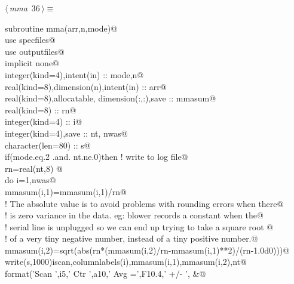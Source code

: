 \documentclass[10pt,a4paper,notitlepage]{article}
\begin{document}
\begin{flushleft} \small
\begin{minipage}{\linewidth}\label{scrap39}\raggedright\small
{} $\langle\,${\it mma}\nobreak\ {\footnotesize {36}}$\,\rangle\equiv$
\vspace{-1ex}
\begin{list}{}{} \item
\mbox{}\verb@      subroutine mma(arr,n,mode)@\\
\mbox{}\verb@      use specfiles@\\
\mbox{}\verb@      use outputfiles@\\
\mbox{}\verb@      implicit none@\\
\mbox{}\verb@      integer(kind=4),intent(in) :: mode,n@\\
\mbox{}\verb@      real(kind=8),dimension(n),intent(in) :: arr@\\
\mbox{}\verb@      real(kind=8),allocatable, dimension(:,:),save :: mmasum@\\
\mbox{}\verb@      real(kind=8) :: rn@\\
\mbox{}\verb@      integer(kind=4) :: i@\\
\mbox{}\verb@      integer(kind=4),save :: nt, nwas@\\
\mbox{}\verb@      character(len=80) :: s@\\
\mbox{}\verb@      if(mode.eq.2 .and. nt.ne.0)then ! write to log file@\\
\mbox{}\verb@        rn=real(nt,8) @\\
\mbox{}\verb@        do i=1,nwas@\\
\mbox{}\verb@        mmasum(i,1)=mmasum(i,1)/rn@\\
\mbox{}\verb@! The absolute value is to avoid problems with rounding errors when there@\\
\mbox{}\verb@! is zero variance in the data. eg: blower records a constant when the@\\
\mbox{}\verb@! serial line is unplugged so we can end up trying to take a square root @\\
\mbox{}\verb@! of a very tiny negative number, instead of a tiny positive number.@\\
\mbox{}\verb@        mmasum(i,2)=sqrt(abs(rn*(mmasum(i,2)/rn-mmasum(i,1)**2)/(rn-1.0d0)))@\\
\mbox{}\verb@        write(s,1000)iscan,columnlabels(i),mmasum(i,1),mmasum(i,2),nt@\\
\mbox{}    format('Scan ',i5,' Ctr ',a10,' Avg =',F10.4,' +/- ',           &@\\

\end{list}
\end{minipage}
\end{flushleft}
\end{document}
